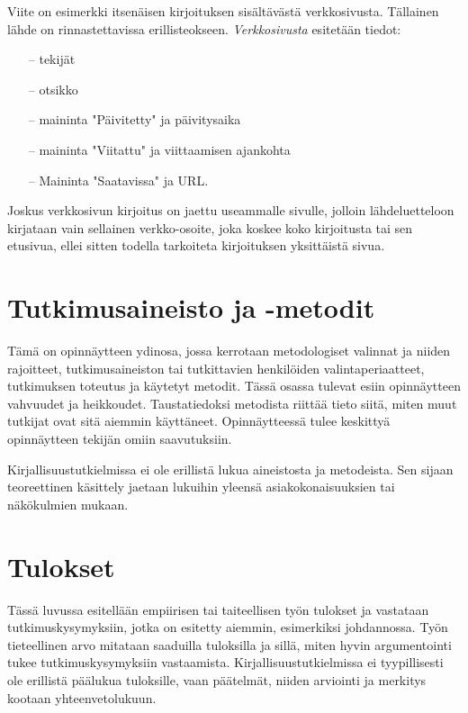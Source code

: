 \documentclass[finnish, 12pt, a4paper, elec, utf8, a-2b, online]{aaltothesis}
\begin{document}
\noindent
Viite \cite{viittaaminen} on esimerkki itsenäisen kirjoituksen sisältävästä
verkkosivusta. Tällainen lähde on rinnastettavissa erillisteokseen.
\textit{Verkkosivusta} esitetään tiedot:
\begin{itemize}
	\setlength{\itemsep}{-3pt}
	\item[--] tekijät
	\item[--] otsikko
	\item[--] maininta "Päivitetty" ja päivitysaika 
	\item[--] maininta "Viitattu" ja viittaamisen ajankohta
	\item[--] Maininta "Saatavissa" ja URL.
\end{itemize}
Joskus verkkosivun kirjoitus on jaettu useammalle sivulle, jolloin
lähdeluetteloon kirjataan vain sellainen verkko-osoite, joka koskee koko 
kirjoitusta tai sen etusivua, ellei sitten todella tarkoiteta kirjoituksen 
yksittäistä sivua. 


\clearpage
\section{Tutkimusaineisto ja -metodit}

Tämä on opinnäytteen ydinosa, jossa kerrotaan metodologiset valinnat ja niiden 
rajoitteet, tutkimusaineiston tai tutkittavien henkilöiden valintaperiaatteet, 
tutkimuksen toteutus ja käytetyt metodit. Tässä osassa tulevat esiin 
opinnäytteen vahvuudet ja heikkoudet. Taustatiedoksi metodista riittää tieto 
siitä, miten muut tutkijat ovat sitä aiemmin käyttäneet. Opinnäytteessä tulee 
keskittyä opinnäytteen tekijän omiin saavutuksiin.

Kirjallisuustutkielmissa ei ole erillistä lukua aineistosta ja metodeista. Sen 
sijaan teoreettinen käsittely jaetaan lukuihin yleensä asiakokonaisuuksien tai 
näkökulmien mukaan.


\clearpage
\section{Tulokset}

Tässä luvussa esitellään empiirisen tai taiteellisen työn tulokset ja vastataan 
tutkimuskysymyksiin, jotka on esitetty aiemmin, esimerkiksi johdannossa. Työn 
tieteellinen arvo mitataan saaduilla tuloksilla ja sillä, miten hyvin 
argumentointi tukee tutkimuskysymyksiin vastaamista. Kirjallisuustutkielmissa 
ei tyypillisesti ole erillistä päälukua tuloksille, vaan päätelmät, niiden 
arviointi ja merkitys kootaan yhteenvetolukuun.
\end{document}
